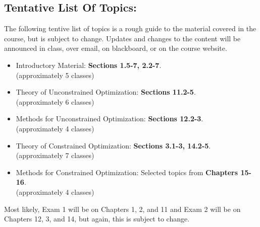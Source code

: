 \documentclass[margin]{res}
\theoremstyle{plain}
\theoremstyle{definition}
\theoremstyle{remark}
\begin{document}
\begin{resume}
\section{Tentative List Of Topics:} The following tentive list of topics is a rough guide to the material covered in the course, but is subject to change. Updates and changes to the content will be announced in class, over email, on blackboard, or on the course website.


\begin{itemize}
\item 
Introductory Material: \textbf{Sections 1.5-7, 2.2-7}. \\(approximately 5 classes)
\item 
Theory of Unconstrained Optimization: \textbf{Sections 11.2-5}. \\(approximately 6 classes)
\item 
Methods for Unconstrained Optimization: \textbf{Sections 12.2-3}. \\(approximately 4 classes)
\item 
Theory of Constrained Optimization: \textbf{Sections 3.1-3, 14.2-5}. \\(approximately 7 classes)
\item 
Methods for Constrained Optimization: Selected topics from \textbf{Chapters 15-16}. \\(approximately 4 classes)
\end{itemize}

Most likely, Exam 1 will be on Chapters 1, 2, and 11 and Exam 2 will be on Chapters 12, 3, and 14, but again, this is subject to change.



\end{resume}
\end{document}
